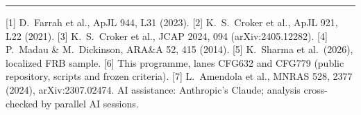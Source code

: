 \documentclass[10pt]{article}
\begin{document}
\vspace{4pt}\hrule\vspace{3pt}
{\footnotesize
[1] D.~Farrah et al., ApJL 944, L31 (2023).
[2] K.~S.~Croker et al., ApJL 921, L22 (2021).
[3] K.~S.~Croker et al., JCAP 2024, 094 (arXiv:2405.12282).
[4] P.~Madau \& M.~Dickinson, ARA\&A 52, 415 (2014).
[5] K.~Sharma et al.\ (2026), localized FRB sample.
[6] This programme, lanes CFG632 and CFG779 (public repository, scripts and frozen criteria).
[7] L.~Amendola et al., MNRAS 528, 2377 (2024), arXiv:2307.02474.
AI assistance: Anthropic's Claude; analysis cross-checked by parallel AI sessions.}
\end{document}
